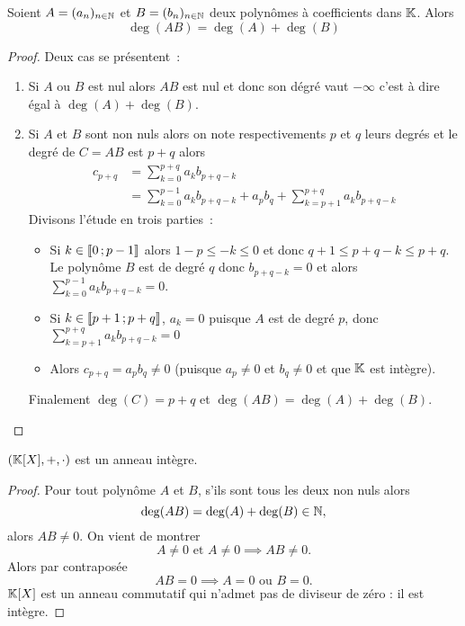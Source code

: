 \begin{prop}
  Soient $A=(a_n)_{n \in \mathbb{N}}$ et $B=(b_n)_{n \in \mathbb{N}}$ deux polynômes à coefficients dans $\mathbb{K}$. Alors
  \begin{equation}
    \deg(AB) = \deg(A)+\deg(B)
  \end{equation}
\end{prop}
\begin{proof}
  Deux cas se présentent~:
  \begin{enumerate}
  \item Si $A$ ou $B$ est nul alors $AB$ est nul et donc son dégré vaut $-\infty$ c'est à dire égal à $\deg(A)+\deg(B)$.
  \item Si $A$ et $B$ sont non nuls alors on note respectivements $p$ et $q$ leurs degrés et le degré de $C=AB$ est $p+q$ alors
    \begin{align}
      c_{p+q} &= \sum_{k=0}^{p+q} a_k b_{p+q-k} \\
      &= \sum_{k=0}^{p-1} a_k b_{p+q-k} + a_pb_q + \sum_{k=p+1}^{p+q} a_k b_{p+q-k}
    \end{align}
    Divisons l'étude en trois parties~:
    \begin{itemize}
    \item     Si $k \in \mathopen{\llbracket}0\mathclose{}\mathpunct{};p-1\mathclose{\rrbracket}$ alors $1-p \leq -k \leq 0$ et donc $q+1 \leq p+q-k \leq p+q$. Le polynôme $B$ est de degré $q$ donc $b_{p+q-k}=0$ et alors $\sum_{k=0}^{p-1} a_k b_{p+q-k}=0$. 
    \item Si $k \in \mathopen{\llbracket}p+1\mathclose{}\mathpunct{};p+q\mathclose{\rrbracket}$, $a_k =0$ puisque $A$ est de degré $p$, donc $\sum_{k=p+1}^{p+q} a_k b_{p+q-k}=0$
    \item Alors $c_{p+q}=a_pb_q \neq 0$ (puisque $a_p \neq 0$ et $b_q \neq 0$ et que $\mathbb{K}$ est intègre). 
      \end{itemize}
Finalement $\deg(C)=p+q$ et $\deg(AB)=\deg(A) + \deg(B)$.
  \end{enumerate}
\end{proof}

\begin{cor}
  $(\mathbb{K}[X],+,\cdot)$ est un anneau intègre.
\end{cor}
\begin{proof}
  Pour tout polynôme $A$ et $B$, s'ils sont tous les deux non nuls alors
  \begin{equation}
    \deg(AB) = \deg(A)+\deg(B) \in \mathbb{N},
  \end{equation}
  alors $AB \neq 0$. On vient de montrer
  \begin{equation}
    A\neq 0 \text{~et~} A \neq 0 \implies AB \neq 0.
  \end{equation}
  Alors par contraposée
  \begin{equation}
    AB = 0 \implies A=0 \text{~ou~} B=0.
  \end{equation}
  $\mathbb{K}[X]$ est un anneau commutatif qui n'admet pas de diviseur de zéro : il est intègre.
\end{proof}


